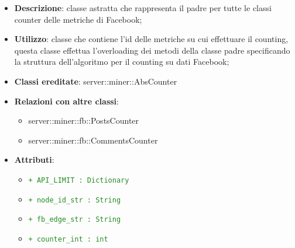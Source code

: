 			\begin{itemize}
				\item \textbf{Descrizione}: classe astratta che rappresenta il padre per tutte le classi counter delle metriche di Facebook;
				\item \textbf{Utilizzo}: classe che contiene l'id delle metriche su cui effettuare il counting, questa classe effettua l'overloading dei metodi della classe padre specificando la struttura dell'algoritmo per il counting su dati Facebook;
				\item \textbf{Classi ereditate}: server::miner::AbsCounter
				\item \textbf{Relazioni con altre classi}:
					\begin{itemize}
						\item server::miner::fb::PostsCounter
						\item server::miner::fb::CommentsCounter
					\end{itemize}
				\item \textbf{Attributi}:  
					\begin{itemize}
						\item \textcolor{forestgreen}{\texttt{+ API\_LIMIT : Dictionary}}
						\item \textcolor{forestgreen}{\texttt{+ node\_id\_str : String}}
						\item \textcolor{forestgreen}{\texttt{+ fb\_edge\_str : String}}
						\item \textcolor{forestgreen}{\texttt{+ counter\_int : int}}
\end{itemize}
\end{itemize}
